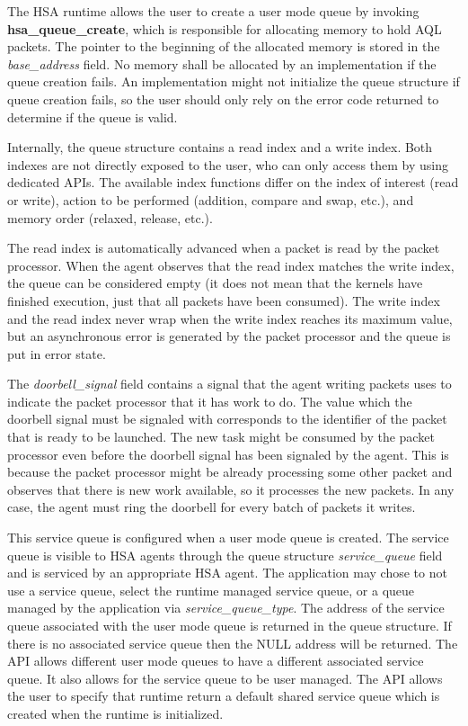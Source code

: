 \documentclass[final]{book}
\newcommand{\mariotodo}[1]{\todo[color=CarnationPink]{#1}}
\newcommand{\reffun}[1]{\textbf{#1}}
\newcommand{\refarg}[1]{\textit{#1}}
\newcommand{\reffld}[1]{\textit{#1}}
\begin{document}
The HSA runtime allows the user to create a user mode queue by invoking
\reffun{hsa_queue_create}, which is responsible for allocating memory to hold
AQL packets. The pointer to the beginning of the allocated memory is stored in
the \reffld{base_address} field. No memory shall be allocated by an
implementation if the queue creation fails. An implementation might not
initialize the queue structure if queue creation fails, so the user should only
rely on the error code returned to determine if the queue is valid.

Internally, the queue structure contains a read index and a write index. Both
indexes are not directly exposed to the user, who can only access them by using
dedicated APIs.  The available index functions differ on the index of interest
(read or write), action to be performed (addition, compare and swap, etc.), and
memory order (relaxed, release, etc.).

The read index is automatically advanced when a packet is read by the packet
processor. When the agent observes that the read index matches the write index,
the queue can be considered empty (it does not mean that the kernels have
finished execution, just that all packets have been consumed). The write index
and the read index never wrap when the write index reaches its maximum value,
but an asynchronous error is generated by the packet processor and the queue is
put in error state.

The \reffld{doorbell_signal} field contains a signal that the agent writing
packets uses to indicate the packet processor that it has work to do. The value
which the doorbell signal must be signaled with corresponds to the identifier of
the packet that is ready to be launched.  The new task might be consumed by the
packet processor even before the doorbell signal has been signaled by the
agent. This is because the packet processor might be already processing some
other packet and observes that there is new work available, so it processes the
new packets. In any case, the agent must ring the doorbell for every batch of
packets it writes.

\mariotodo{clarify service queues}This service queue is configured when a user
mode queue is created. The service queue is visible to HSA agents through the
queue structure \reffld{service_queue} field and is serviced by an appropriate
HSA agent. The application may chose to not use a service queue, select the
runtime managed service queue, or a queue managed by the application via
\refarg{service_queue_type}. The address of the service queue associated with
the user mode queue is returned in the queue structure. If there is no
associated service queue then the NULL address will be returned. The API allows
different user mode queues to have a different associated service queue. It also
allows for the service queue to be user managed. The API allows the user to
specify that runtime return a default shared service queue which is created when
the runtime is initialized.
\end{document}
